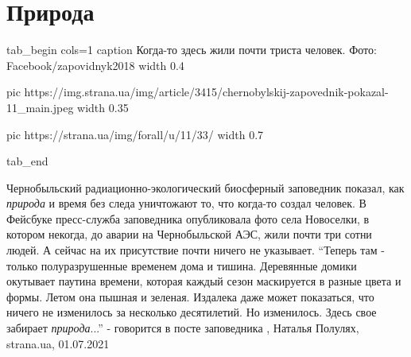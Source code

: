  
 
 
 
 
\chapter{Природа}


\ifcmt
  tab_begin cols=1
     caption Когда-то здесь жили почти триста человек. Фото: Facebook/zapovidnyk2018
     width 0.4

     pic https://img.strana.ua/img/article/3415/chernobylskij-zapovednik-pokazal-11_main.jpeg
     width 0.35

     pic https://strana.ua/img/forall/u/11/33/%
     width 0.7

  tab_end
\fi

Чернобыльский радиационно-экологический биосферный заповедник показал,
как \emph{природа} и время без следа уничтожают то, что когда-то создал человек.  В
Фейсбуке пресс-служба заповедника опубликовала фото села Новоселки, в котором
некогда, до аварии на Чернобыльской АЭС, жили почти три сотни людей. А сейчас
на их присутствие почти ничего не указывает. \enquote{Теперь там - только
полуразрушенные временем дома и тишина. Деревянные домики окутывает паутина
времени, которая каждый сезон маскируется в разные цвета и формы. Летом она
пышная и зеленая. Издалека даже может показаться, что ничего не изменилось за
несколько десятилетий. Но изменилось. Здесь свое забирает \emph{природа}...} -
говорится в посте заповедника
, 
Наталья Полулях, strana.ua, 01.07.2021
